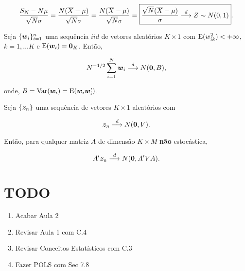 \documentclass[11pt, oneside, a4paper, article]{article}
\numberwithin{equation}{section}
\begin{document}
\begin{description}
\begin{description}
\begin{def1}
\begin{align*}
\frac{S_{N} - N \mu }{ \sqrt{N} \sigma}
=
\frac{N ( \overline{X} - \mu ) }{ \sqrt{N} \sigma}
=
\frac{N ( \overline{X} - \mu ) }{ \sqrt{N} \sigma}
=
\boxed{
\frac{\sqrt{N} ( \overline{X} - \mu ) }{\sigma}
 \overset{d}{\longrightarrow}  Z \sim N(0,1)}.
\end{align*}
\end{def1}

\begin{def1}
Seja $\{\boldsymbol{w}_{i}\}_{i=1}^{n}$ uma sequência $iid$ de vetores aleatórios $K \times 1$ com
$\text{E}( w_{ik}^{2} ) < + \infty$, $k= 1, \dots K$ e $\text{E}( \boldsymbol{w}_{i} ) = \boldsymbol{0}_{K}$.
Então,

\vspace{-1 em}
\begin{align*}
	N^{-1/2} \sum_{i=1}^{N} \boldsymbol{w}_{i}  \overset{d}{\longrightarrow}  N(\boldsymbol{0}, B),
\end{align*}

\noindent
onde, $B=\text{Var}(\boldsymbol{w}_{i}) = \text{E}( \boldsymbol{w}_{i} \boldsymbol{w}_{i}')$.
\end{def1}

\begin{def1}[]
Seja $\{\boldsymbol{z}_{n}\}$ uma sequência de vetores $K \times 1$ aleatórios com 

\vspace{-1 em}
\begin{align*}
	\boldsymbol{z}_{n}  \overset{d}{\longrightarrow}  N(\boldsymbol{0}, V).
\end{align*}

Então, para qualquer matriz $A$ de dimensão $K \times M$ \textbf{não} estocástica,

\vspace{-1 em}
\begin{align*}
	A' \boldsymbol{z}_{n}  \overset{d}{\longrightarrow}  N(\boldsymbol{0}, A'VA).
\end{align*}
\end{def1}



\clearpage
\section*{TODO}

\begin{enumerate}[noitemsep]
	\item Acabar Aula 2
	\item Revisar Aula 1 com C.4
	\item Revisar Conceitos Estatísticos com C.3
	\item Fazer POLS com Sec 7.8
\end{enumerate}


\end{description}
\end{description}
\end{document}
